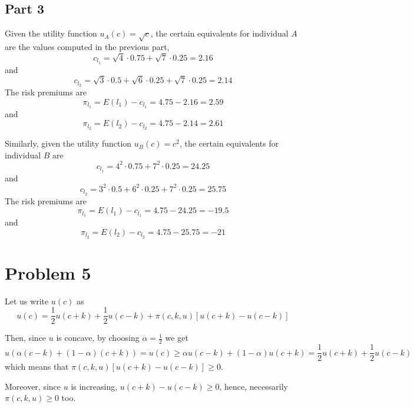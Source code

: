 \documentclass[12pt]{extarticle}
\numberwithin{table}{section}
\numberwithin{figure}{section}
\numberwithin{equation}{section}
\begin{document}
\subsection*{Part 3}
Given the utility function $u_A(c) = \sqrt c$,
the certain equivalents for individual $A$ are the values computed in the previous part,
\begin{equation}
	c_{l_1} = \sqrt4 \cdot 0.75 + \sqrt7 \cdot 0.25 = 2.16
\end{equation}
and
\begin{equation}
	c_{l_2} = \sqrt3 \cdot 0.5 + \sqrt6 \cdot 0.25 + \sqrt7 \cdot 0.25 = 2.14
\end{equation}
The risk premiums are
\begin{equation}
	\pi_{l_1} = E(l_1) - c_{l_1} = 4.75 - 2.16 = 2.59
\end{equation}
and
\begin{equation}
	\pi_{l_2} = E(l_2) - c_{l_2} = 4.75 - 2.14 = 2.61
\end{equation}

Similarly, given the utility function $u_B(c) = c^2$, the certain equivalents for individual $B$ are
\begin{equation}
	c_{l_1} = 4^2 \cdot 0.75 + 7^2 \cdot 0.25 = 24.25
\end{equation}
and
\begin{equation}
	c_{l_2} = 3^2 \cdot 0.5 + 6^2 \cdot 0.25 + 7^2 \cdot 0.25 = 25.75
\end{equation}
The risk premiums are
\begin{equation}
	\pi_{l_1} = E(l_1) - c_{l_1} = 4.75 - 24.25 = -19.5
\end{equation}
and
\begin{equation}
	\pi_{l_2} = E(l_2) - c_{l_2} = 4.75 - 25.75 = -21
\end{equation}

\section*{Problem 5}

Let us write $u(c)$ as
\begin{equation}
	u(c) = \frac{1}{2} u(c + k) + \frac{1}{2} u(c-k) + \pi(c, k, u) [ u(c + k) - u(c-k)]
\end{equation}

Then, since $u$ is concave, by choosing $\alpha = \frac{1}{2}$ we get
\begin{equation}
	u(\alpha (c - k) + (1-\alpha) (c + k)) = u(c) \geq \alpha u(c - k) + (1-\alpha) u(c+k) = \frac{1}{2} u(c + k) + \frac{1}{2} u(c-k)
\end{equation}
which means that $\pi(c, k, u) [ u(c + k) - u(c-k)] \geq 0$.

Moreover, since $u$ is increasing, $u(c + k) - u(c-k) \geq 0$, hence, necessarily $\pi(c, k, u) \geq 0$ too.
\end{document}
